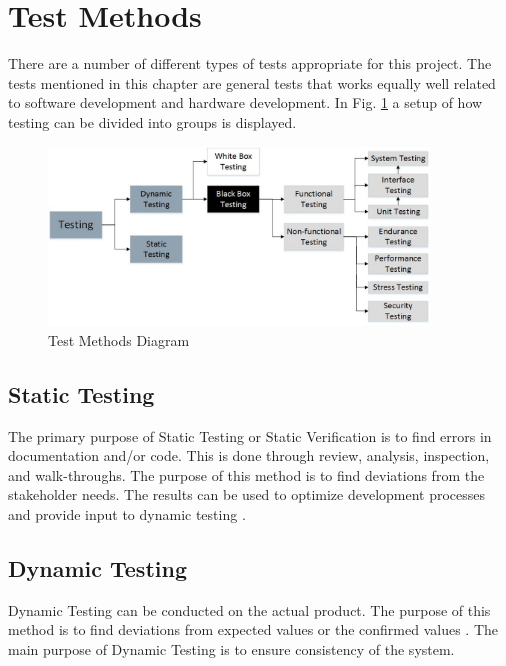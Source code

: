 \section{Test Methods}
There are a number of different types of tests appropriate for this project. The tests mentioned in this chapter are general tests that works equally well related to software development and hardware development. In Fig. \ref{fig:testing} a setup of how testing can be divided into groups is displayed.

\begin{figure}[h]
    \centering
        \includegraphics[width=0.9\textwidth]{VAPIQ-PICTURES/testing}
        \caption{Test Methods Diagram}
        \label{fig:testing}
\end{figure}

\subsection*{Static Testing}
The primary purpose of Static Testing or Static Verification is to find errors in documentation and/or code. This is done through review, analysis, inspection, and walk-throughs. The purpose of this method is to find deviations from the stakeholder needs. The results can be used to optimize development processes and provide input to dynamic testing \cite{ref3}. 

\subsection*{Dynamic Testing}
Dynamic Testing can be conducted on the actual product. The purpose of this method is to find deviations from expected values or the confirmed values \cite{ref3}. The main purpose of Dynamic Testing is to ensure consistency of the system.
\newpage

 